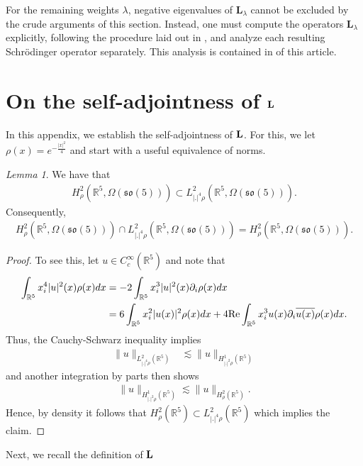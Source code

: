 \documentclass[11pt,reqno]{amsart}
\theoremstyle{remark}
\newtheorem{lem}{Lemma}[section]
\newcommand{\R}{\mathbb{R}}
\newcommand{\Lf}{\textup{\textbf{L}}}
\renewcommand{\Re}{\textup{Re}}
\theoremstyle{definition}
\begin{document}
For the remaining weights $\lambda$, negative eigenvalues of $\mathbf L_\lambda$ cannot be excluded by the crude arguments of this section. Instead, one must compute the operators $\mathbf L_\lambda$ explicitly, following the procedure laid out in , and analyze each resulting Schr\"odinger operator separately. This analysis is contained in  of this article.

\appendix
\section{On the self-adjointness of $\Lf$}

In this appendix, we establish the self-adjointness of $\Lf$. For this, we let $\rho(x)=e^{-\frac{|x|^2}{4}}$ and start with a useful equivalence of norms. 
\begin{lem}
    We have that 
    \begin{align*}
     H^2_\rho(\R^5,\Omega(\mathfrak{so}(5)))
     \subset   L^2_{|.|^4\rho}(\R^5,\Omega(\mathfrak{so}(5))).
    \end{align*}
    Consequently, 
    \begin{align*}
        H^2_\rho(\R^5,\Omega(\mathfrak{so}(5)))\cap L^2_{|.|^4\rho}(\R^5,\Omega(\mathfrak{so}(5)))=H^2_\rho(\R^5,\Omega(\mathfrak{so}(5))).
    \end{align*}
\end{lem}
 \begin{proof}
     To see this, let $u\in C^\infty_c(\R^5)$ and note that 
\begin{align*}
    \int_{\R^5} x_i^4 |u|^2(x) \rho(x) dx&= -2\int_{\R^5} x_i^3 |u|^2(x) \partial_i\rho(x) dx
    \\
    &=6\int_{\R^5} x_i^2 |u(x)|^2 \rho(x) dx+4\Re\int_{\R^5} x_i^3 u(x)\partial_i\overline{u(x)} \rho(x) dx.
\end{align*}
Thus, the Cauchy-Schwarz inequality implies 
\begin{align*}
    \|u\|_{L^2_{|.|^4\rho}(\R^5)}&\lesssim   \|u\|_{H^1_{|.|^2\rho}(\R^5)}
\end{align*}
and another integration by parts then shows
\begin{align*}
    \|u\|_{H^1_{|.|^2\rho}(\R^5)}\lesssim \|u\|_{H^2_{\rho}(\R^5)}.
\end{align*}
Hence, by density it follows that $ H^2_\rho(\R^5)\subset L^2_{|.|^4\rho}(\R^5) $ which implies the claim. 
 \end{proof}
 Next, we recall the definition of $\Lf$
\end{document}
